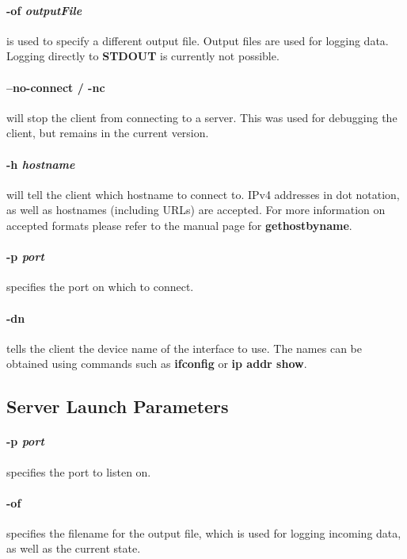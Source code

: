 \paragraph{-of \textit{outputFile}} is used to specify a different output file.
Output files are used for logging data.
Logging directly to \textbf{STDOUT} is currently not possible.

\paragraph{--no-connect / -nc} will stop the client from connecting to a server.
This was used for debugging the client, but remains in the current version.

\paragraph{-h \textit{hostname}} will tell the client which hostname to connect to.
IPv4 addresses in dot notation, as well as hostnames (including URLs) are accepted.
For more information on accepted formats please refer to the manual page for \textbf{gethostbyname}.

\paragraph{-p \textit{port}} specifies the port on which to connect.

\paragraph{-dn} tells the client the device name of the interface to use.
The names can be obtained using commands such as \textbf{ifconfig} or \textbf{ip addr show}.

\subsection*{Server Launch Parameters}
\paragraph{-p \textit{port}} specifies the port to listen on.

\paragraph{-of} specifies the filename for the output file, which is used for logging incoming data, as well as the current state.


